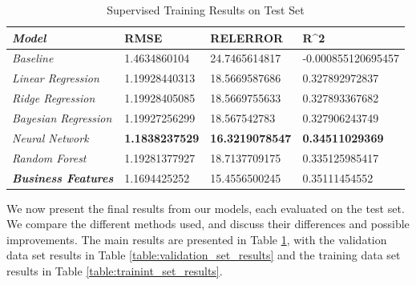 \documentclass[letterpaper, 10 pt, conference]{ieeeconf}  %
\begin{document}
{\renewcommand{\arraystretch}{2}%
\begin{table}[t]
\centering
\caption{Supervised Training Results on Test Set}
\label{table:test_set_results}
\begin{tabular}{|l|lll}
\hline
\textit{\textbf{Model}}      & \multicolumn{1}{l|}{\textbf{RMSE}} & \multicolumn{1}{l|}{\textbf{RELERROR}} & \multicolumn{1}{l|}{\textbf{R\textasciicircum 2}} \\ \hline
\textit{Baseline}            & 1.4634860104                       & 24.7465614817                          & -0.000855120695457                                \\ \cline{1-1}
\textit{Linear Regression}   & 1.19928440313                      & 18.5669587686                          & 0.327892972837                                    \\ \cline{1-1}
\textit{Ridge Regression}    & 1.19928405085                      & 18.5669755633                          & 0.327893367682                                    \\ \cline{1-1}
\textit{Bayesian Regression} & 1.19927256299                      & 18.567542783                           & 0.327906243749                                    \\ \cline{1-1}
\textit{Neural Network}      & \textbf{1.1838237529}              & \textbf{16.3219078547}                 & \textbf{0.34511029369}                            \\ \cline{1-1}
\textit{Random Forest}       & 1.19281377927                      & 18.7137709175                          & 0.335125985417                                    \\ \cline{1-1}
\textit{\textbf{Business Features}}       & 1.1694425252            & 15.4556500245                 & 0.35111454552                           \\ \cline{1-1}
\end{tabular}
\end{table}
}

We now present the final results from our models, each evaluated on the test set. We compare the different methods used, and discuss their differences and possible improvements. The main results are presented in Table \ref{table:test_set_results}, with the validation data set results in Table \ref{table:validation_set_results} and the training data set results in Table \ref{table:trainint_set_results}. 
\end{document}
